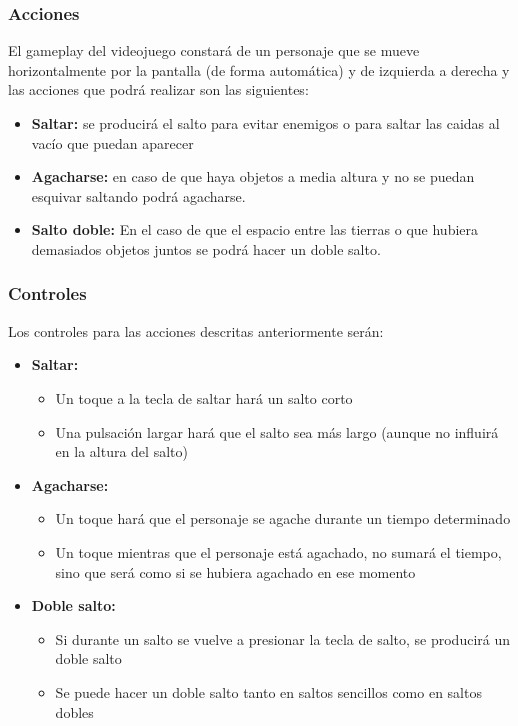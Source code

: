\documentclass[a4paper]{article}
\begin{document}
\subsubsection{Acciones}
El gameplay del videojuego constará de un personaje que se mueve horizontalmente por la pantalla (de forma automática) y de izquierda a derecha y las acciones que podrá realizar son las siguientes:

\begin{itemize}
    \item \textbf{Saltar:} se producirá el salto para evitar enemigos o para saltar las caidas al vacío que puedan aparecer
    \item \textbf{Agacharse:} en caso de que haya objetos a media altura y no se puedan esquivar saltando podrá agacharse.
    \item \textbf{Salto doble:} En el caso de que el espacio entre las tierras o que hubiera demasiados objetos juntos se podrá hacer un doble salto.
\end{itemize}



\subsubsection{Controles}
Los controles para las acciones descritas anteriormente serán:
\begin{itemize}
    \item \textbf{Saltar:}
        \begin{itemize}
            \item Un toque a la tecla de saltar hará un salto corto
            \item Una pulsación largar hará que el salto sea más largo (aunque no influirá en la altura del salto) 
        \end{itemize}
    \item \textbf{Agacharse:}
        \begin{itemize}
            \item Un toque hará que el personaje se agache durante un tiempo determinado
            \item Un toque mientras que el personaje está agachado, no sumará el tiempo, sino que será como si se hubiera agachado en ese momento
        \end{itemize}
    \item \textbf{Doble salto:}
        \begin{itemize}
            \item Si durante un salto se vuelve a presionar la tecla de salto, se producirá un doble salto
            \item Se puede hacer un doble salto tanto en saltos sencillos como en saltos dobles
        \end{itemize}
\end{itemize}
\end{document}

